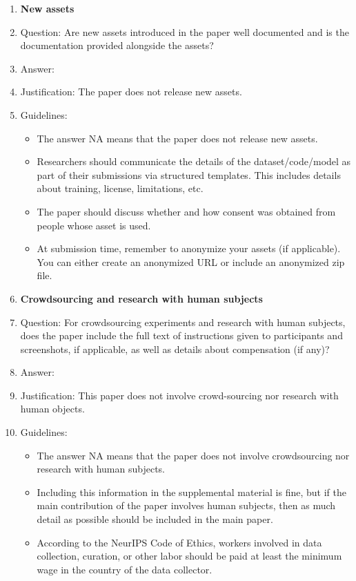 \documentclass{article}
\begin{document}
\begin{enumerate}
\item {\bf New assets}
    \item[] Question: Are new assets introduced in the paper well documented and is the documentation provided alongside the assets?
    \item[] Answer: \answerNA{} %
    \item[] Justification: The paper does not release new assets.
    \item[] Guidelines:
    \begin{itemize}
        \item The answer NA means that the paper does not release new assets.
        \item Researchers should communicate the details of the dataset/code/model as part of their submissions via structured templates. This includes details about training, license, limitations, etc. 
        \item The paper should discuss whether and how consent was obtained from people whose asset is used.
        \item At submission time, remember to anonymize your assets (if applicable). You can either create an anonymized URL or include an anonymized zip file.
    \end{itemize}

\item {\bf Crowdsourcing and research with human subjects}
    \item[] Question: For crowdsourcing experiments and research with human subjects, does the paper include the full text of instructions given to participants and screenshots, if applicable, as well as details about compensation (if any)? 
    \item[] Answer: \answerNA{} %
    \item[] Justification: This paper does not involve crowd-sourcing nor research with human objects.
    \item[] Guidelines:
    \begin{itemize}
        \item The answer NA means that the paper does not involve crowdsourcing nor research with human subjects.
        \item Including this information in the supplemental material is fine, but if the main contribution of the paper involves human subjects, then as much detail as possible should be included in the main paper. 
        \item According to the NeurIPS Code of Ethics, workers involved in data collection, curation, or other labor should be paid at least the minimum wage in the country of the data collector. 
    \end{itemize}


\end{enumerate}
\end{document}
